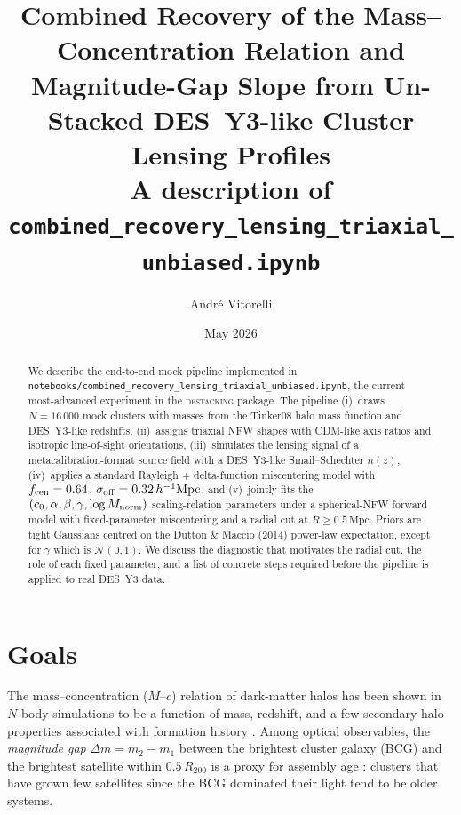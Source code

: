 \documentclass[11pt,a4paper]{article}
\title{\textbf{Combined Recovery of the Mass--Concentration Relation and
Magnitude-Gap Slope from Un-Stacked DES~Y3-like Cluster Lensing Profiles}\\[0.4em]
\large A description of \texttt{combined\_recovery\_lensing\_triaxial\_unbiased.ipynb}}
\author{Andr\'e Vitorelli}
\date{May 2026}
\newcommand{\sigmaoff}{\sigma_{\rm off}}
\newcommand{\fcen}{f_{\rm cen}}
\newcommand{\dm}{\Delta m}
\begin{document}
\maketitle

\begin{abstract}
We describe the end-to-end mock pipeline implemented in
\texttt{notebooks/combined\_recovery\_lensing\_triaxial\_unbiased.ipynb}, the
current most-advanced experiment in the \textsc{destacking} package.  The
pipeline (i)~draws $N=16\,000$ mock clusters with masses from the Tinker08
halo mass function and DES~Y3-like \citep{Costanzi2021} redshifts, (ii)~assigns
triaxial NFW shapes with CDM-like axis ratios and isotropic line-of-sight
orientations, (iii)~simulates the lensing signal of a metacalibration-format
source field with a DES~Y3-like Smail--Schechter $n(z)$, (iv)~applies a standard
Rayleigh + delta-function miscentering model with $\fcen=0.64$,
$\sigmaoff=0.32\,h^{-1}\mathrm{Mpc}$, and (v)~jointly fits the
$(c_0, \alpha, \beta, \gamma, \log M_{\rm norm})$ scaling-relation parameters
under a spherical-NFW forward model with fixed-parameter miscentering and a
radial cut at $R \ge 0.5\,\mathrm{Mpc}$.  Priors are tight Gaussians centred on
the Dutton \& Maccio (2014) power-law expectation, except for $\gamma$ which is
$\mathcal{N}(0, 1)$.  We discuss the diagnostic that motivates the radial cut,
the role of each fixed parameter, and a list of concrete steps required before
the pipeline is applied to real DES~Y3 data.
\end{abstract}

\tableofcontents
\newpage

\section{Goals}

The mass--concentration ($M$--$c$) relation of dark-matter halos has been
shown in $N$-body simulations to be a function of mass, redshift, and a few
secondary halo properties associated with formation history
\citep{Wechsler2002, DuttonMaccio2014, Diemer2019}.  Among optical
observables, the \emph{magnitude gap}
$\dm = m_2 - m_1$ between the brightest cluster galaxy (BCG) and the
brightest satellite within $0.5\,R_{200}$ is a proxy for assembly age
\citep{Jones2003, Khosroshahi2006}: clusters that have grown few satellites
since the BCG dominated their light tend to be older systems.
\end{document}
